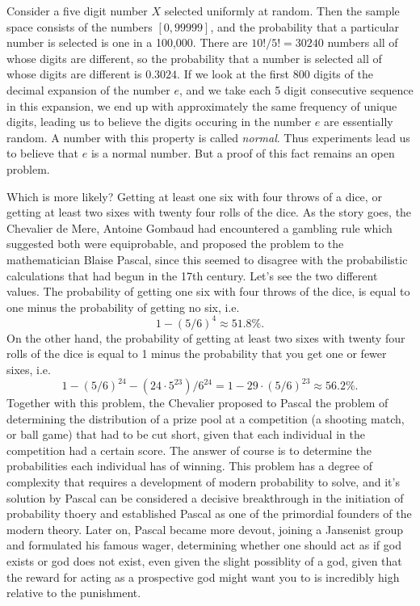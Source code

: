 \begin{example}
    Consider a five digit number $X$ selected uniformly at random. Then the sample space consists of the numbers $[0,99999]$, and the probability that a particular number is selected is one in a 100,000. There are $10!/5! = 30240$ numbers all of whose digits are different, so the probability that a number is selected all of whose digits are different is $0.3024$. If we look at the first 800 digits of the decimal expansion of the number $e$, and we take each 5 digit consecutive sequence in this expansion, we end up with approximately the same frequency of unique digits, leading us to believe the digits occuring in the number $e$ are essentially random. A number with this property is called \emph{normal}. Thus experiments lead us to believe that $e$ is a normal number. But a proof of this fact remains an open problem.
\end{example}

\begin{example}
    Which is more likely? Getting at least one six with four throws of a dice, or getting at least two sixes with twenty four rolls of the dice. As the story goes, the Chevalier de Mere, Antoine Gombaud had encountered a gambling rule which suggested both were equiprobable, and proposed the problem to the mathematician Blaise Pascal, since this seemed to disagree with the probabilistic calculations that had begun in the 17th century. Let's see the two different values. The probability of getting one six with four throws of the dice, is equal to one minus the probability of getting no six, i.e.
    \[ 1 - (5/6)^4 \approx 51.8\%. \]
    On the other hand, the probability of getting at least two sixes with twenty four rolls of the dice is equal to 1 minus the probability that you get one or fewer sixes, i.e.
    \[ 1 - (5/6)^{24} - (24 \cdot 5^{23}) / 6^{24} = 1 - 29 \cdot (5/6)^{23} \approx 56.2\%. \]
    Together with this problem, the Chevalier proposed to Pascal the problem of determining the distribution of a prize pool at a competition (a shooting match, or ball game) that had to be cut short, given that each individual in the competition had a certain score. The answer of course is to determine the probabilities each individual has of winning. This problem has a degree of complexity that requires a development of modern probability to solve, and it's solution by Pascal can be considered a decisive breakthrough in the initiation of probability thoery and established Pascal as one of the primordial founders of the modern theory. Later on, Pascal became more devout, joining a Jansenist group and formulated his famous wager, determining whether one should act as if god exists or god does not exist, even given the slight possiblity of a god, given that the reward for acting as a prospective god might want you to is incredibly high relative to the punishment.
\end{example}

